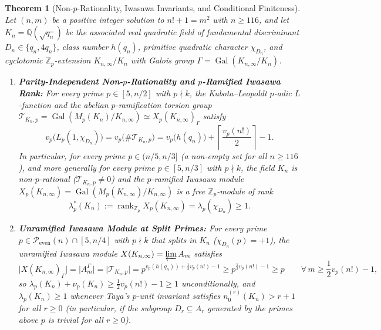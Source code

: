 \documentclass[11pt,reqno]{amsart}
\newtheorem{theorem}{Theorem}[section]
\theoremstyle{remark}
\numberwithin{equation}{section}
\newcommand{\Z}{\mathbb{Z}}
\newcommand{\Q}{\mathbb{Q}}
\newcommand{\Peven}{\mathcal{P}_{\mathrm{even}}}
\DeclareMathOperator{\Gal}{Gal}
\DeclareMathOperator{\rank}{rank}
\begin{document}
\begin{theorem}[{Non-$p$-Rationality, Iwasawa Invariants, and Conditional Finiteness}]\label{thm:1.2}
Let $(n, m)$ be a positive integer solution to $n! + 1 = m^2$ with $n \ge 116$, and let $K_n = \Q(\sqrt{q_n})$ be the associated real quadratic field of fundamental discriminant $D_n \in \{q_n, 4q_n\}$, class number $h(q_n)$, primitive quadratic character $\chi_{D_n}$, and cyclotomic $\Z_p$-extension $K_{n,\infty}/K_n$ with Galois group $\Gamma = \Gal(K_{n,\infty}/K_n)$.
\begin{enumerate}
\item[(i)] \textbf{Parity-Independent Non-$p$-Rationality and $p$-Ramified Iwasawa Rank:} For every prime $p \in [5, n/2]$ with $p \nmid k$, the Kubota--Leopoldt $p$-adic $L$-function and the abelian $p$-ramification torsion group $\mathcal{T}_{K_n, p} = \Gal(M_p(K_n)/K_{n,\infty}) \simeq X_p(K_{n,\infty})_\Gamma$ satisfy
\begin{equation}\label{eq:1.8}
v_p\bigl(L_p(1, \chi_{D_n})\bigr) = v_p\bigl(\#\mathcal{T}_{K_n, p}\bigr) = v_p\bigl(h(q_n)\bigr) + \left\lceil \frac{v_p(n!)}{2} \right\rceil - 1.
\end{equation}
In particular, for every prime $p \in (n/5, n/3]$ (a non-empty set for all $n \ge 116$), and more generally for every prime $p \in [5, n/3]$ with $p \nmid k$, the field $K_n$ is non-$p$-rational ($\mathcal{T}_{K_n, p} \ne 0$) and the $p$-ramified Iwasawa module $X_p(K_{n,\infty}) = \Gal(M_p(K_{n,\infty})/K_{n,\infty})$ is a free $\Z_p$-module of rank
\[
\lambda_p^*(K_n) := \rank_{\Z_p} X_p(K_{n,\infty}) = \lambda_p(\chi_{D_n}) \ge 1.
\]
\item[(ii)] \textbf{Unramified Iwasawa Module at Split Primes:} For every prime $p \in \Peven(n) \cap [5, n/4]$ with $p \nmid k$ that splits in $K_n$ ($\chi_{D_n}(p) = +1$), the unramified Iwasawa module $X(K_{n,\infty}) = \varprojlim A_m$ satisfies
\[
\bigl|X(K_{n,\infty})_\Gamma\bigr| = \bigl|A_m^\Gamma\bigr| = \bigl|\mathcal{T}_{K_n, p}\bigr| = p^{v_p(h(q_n)) + \frac{1}{2}v_p(n!) - 1} \ge p^{\frac{1}{2}v_p(n!) - 1} \ge p \qquad \forall\, m \ge \frac{1}{2}v_p(n!) - 1,
\]
so $\lambda_p(K_n) + \nu_p(K_n) \ge \frac{1}{2}v_p(n!) - 1 \ge 1$ unconditionally, and $\lambda_p(K_n) \ge 1$ whenever Taya's $p$-unit invariant satisfies $n_0^{(r)}(K_n) > r + 1$ for all $r \ge 0$ (in particular, if the subgroup $D_r \subseteq A_r$ generated by the primes above $p$ is trivial for all $r \ge 0$).

\end{enumerate}
\end{theorem}
\end{document}
